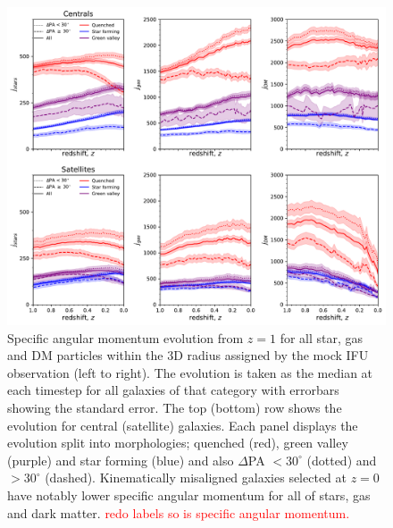 \documentclass[fleqn,usenatbib]{mnras}
\newcommand{\red}[1]{{\textcolor{red}{#1}}}
\begin{document}
\begin{figure}
	\includegraphics[width=\linewidth]{tng_results/sJ_evo_cen_sat.pdf}
    \caption{Specific angular momentum evolution from $z = 1$ for all star, gas and DM particles within the 3D radius assigned by the mock IFU observation (left to right). The evolution is taken as the median at each timestep for all galaxies of that category with errorbars showing the standard error. The top (bottom) row shows the evolution for central (satellite) galaxies. Each panel displays the evolution split into morphologies; quenched (red), green valley (purple) and star forming (blue) and also $\Delta$PA $< 30^{\circ}$ (dotted) and $> 30^{\circ}$ (dashed). Kinematically misaligned galaxies selected at $z=0$ have notably lower specific angular momentum for all of stars, gas and dark matter. \red{redo labels so is specific angular momentum.}}
    \label{fig:sJ_evo}
\end{figure}
\end{document}
